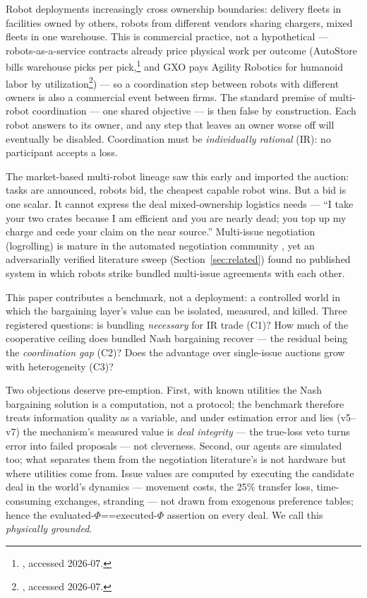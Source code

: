 \documentclass[sigconf,nonacm]{acmart}
\begin{document}
Robot deployments increasingly cross ownership boundaries: delivery fleets
in facilities owned by others, robots from different vendors sharing
chargers, mixed fleets in one warehouse. This is commercial practice, not a
hypothetical --- robots-as-a-service contracts already price physical work
per outcome (AutoStore bills warehouse picks per
pick,\footnote{, accessed 2026-07.}
and GXO pays Agility Robotics for humanoid labor by
utilization\footnote{, accessed 2026-07.})
--- so a coordination step between robots with different owners is also a
commercial event between firms. The standard premise of multi-robot
coordination --- one shared objective --- is then false by construction. Each robot answers to its owner, and any step that leaves an
owner worse off will eventually be disabled. Coordination must be
\emph{individually rational} (IR): no participant accepts a loss.

The market-based multi-robot lineage
\cite{gerkey2002murdoch,gerkey2004taxonomy,dias2006market} saw this early
and imported the auction: tasks are announced, robots bid, the cheapest
capable robot wins. But a bid is one scalar. It cannot express the deal
mixed-ownership logistics needs --- ``I take your two crates because I am
efficient and you are nearly dead; you top up my charge and cede your claim
on the near source.'' Multi-issue negotiation (logrolling) is mature in the
automated negotiation community \cite{baarslag2015anac,aydogan2026anac},
yet an adversarially verified literature sweep
(Section~\ref{sec:related}) found no published system in which robots
strike bundled multi-issue agreements with each other.

This paper contributes a benchmark, not a deployment: a controlled world in
which the bargaining layer's value can be isolated, measured, and killed.
Three registered questions: is bundling \emph{necessary} for IR trade (C1)?
How much of the cooperative ceiling does bundled Nash bargaining recover
--- the residual being the \emph{coordination gap} (C2)? Does the advantage
over single-issue auctions grow with heterogeneity (C3)?

Two objections deserve pre-emption. First, with known utilities the Nash
bargaining solution is a computation, not a protocol; the benchmark
therefore treats information quality as a variable, and under estimation
error and lies (v5--v7) the mechanism's measured value is \emph{deal
integrity} --- the true-loss veto turns error into failed proposals --- not
cleverness. Second, our agents are simulated too; what separates them from
the negotiation literature's is not hardware but where utilities come from.
Issue values are computed by executing the candidate deal in the world's
dynamics --- movement costs, the 25\% transfer loss, time-consuming
exchanges, stranding --- not drawn from exogenous preference tables; hence
the evaluated-$\Phi$==executed-$\Phi$ assertion on every deal. We call this
\emph{physically grounded}.
\end{document}
